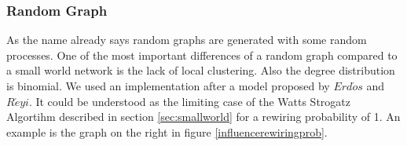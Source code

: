 \subsubsection{Random Graph}
\label{sec:randomgraph}
As the name already says random graphs are generated with some random
processes. One of the most important differences of a random graph compared to
a small world network is the lack of local clustering. Also the degree
distribution is binomial. We used an implementation after a model proposed by
$Erd\acute{o}s$ and $R\acute{e}yi$. It could be understood as the limiting case
of the Watts Strogatz Algortihm described in section \ref{sec:smallworld} for a
rewiring probability of 1. An example is the graph on the right in figure
\ref{influencerewiringprob}.


